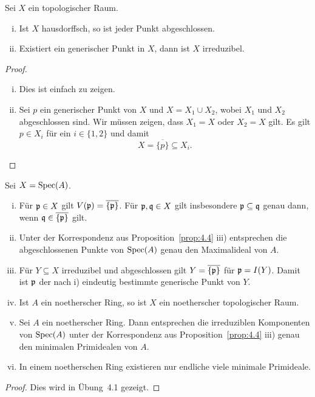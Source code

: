 \begin{lem}
\label{lem:4.6}
	Sei $X$ ein topologischer Raum.
	\begin{enumerate}[i)]
		\item Ist $X$ hausdorffsch, so ist jeder Punkt abgeschlossen.
		\item Existiert ein generischer Punkt in $X$, dann ist $X$ irreduzibel.
	\end{enumerate}
	\begin{proof}
		\begin{enumerate}[i)]
			\item Dies ist einfach zu zeigen.
			\item Sei $p$ ein generischer Punkt von $X$ und $X = X_1 \cup X_2$, wobei $X_1$ und $X_2$ abgeschlossen sind. Wir müssen zeigen, dass $X_1=X$ oder $X_2=X$ gilt. Es gilt $p \in X_i$ für ein $i \in \{1,2\}$ und damit
			\[
				X = \overline{\{p\}} \subseteq X_i.
			\]
		\end{enumerate}
	\end{proof}
\end{lem}

\begin{prop}
\label{prop:4.7}
	Sei $X = \operatorname{Spec}(A)$.
	\begin{enumerate}[i)]
		\item Für $\mathfrak{p} \in X$ gilt $V(\mathfrak{p}) = \overline{\{\mathfrak{p}\}}$. Für $\mathfrak{p}, \mathfrak{q} \in X$ gilt insbesondere $\mathfrak{p} \subseteq \mathfrak{q}$ genau dann, wenn $\mathfrak{q} \in \overline{\{\mathfrak{p}\}}$ gilt.
		\item Unter der Korrespondenz aus Proposition~\ref{prop:4.4} iii) entsprechen die abgeschlossenen Punkte von $\operatorname{Spec}(A)$ genau den Maximalideal von $A$.
		\item Für $Y \subseteq X$ irreduzibel und abgeschlossen gilt $Y = \overline{\{\mathfrak{p}\}}$ für $\mathfrak{p} = I(Y)$. Damit ist $\mathfrak{p}$ der nach i) eindeutig bestimmte generische Punkt von $Y$.
		\item Ist $A$ ein noetherscher Ring, so ist $X$ ein noetherscher topologischer Raum.
		\item Sei $A$ ein noetherscher Ring. Dann entsprechen die irreduziblen Komponenten von $\operatorname{Spec}(A)$ unter der Korrespondenz aus Proposition~\ref{prop:4.4} iii) genau den minimalen Primidealen von $A$.
		\item In einem noetherschen Ring existieren nur endliche viele minimale Primideale.
	\end{enumerate}
	\begin{proof}
		Dies wird in Übung~4.1 gezeigt.
	\end{proof}
\end{prop}


